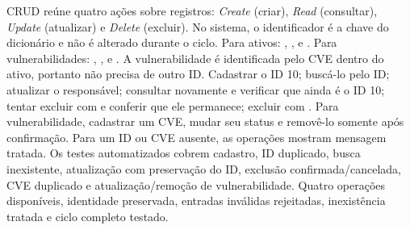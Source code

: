 
 CRUD reúne quatro ações sobre registros: \textit{Create} (criar), \textit{Read} (consultar), \textit{Update} (atualizar) e \textit{Delete} (excluir). No sistema, o identificador é a chave do dicionário e não é alterado durante o ciclo.
 Para ativos: , ,  e . Para vulnerabilidades: , ,  e . A vulnerabilidade é identificada pelo CVE dentro do ativo, portanto não precisa de outro ID.
 Cadastrar o ID 10; buscá-lo pelo ID; atualizar o responsável; consultar novamente e verificar que ainda é o ID 10; tentar excluir com  e conferir que ele permanece; excluir com . Para vulnerabilidade, cadastrar um CVE, mudar seu status e removê-lo somente após confirmação. Para um ID ou CVE ausente, as operações mostram mensagem tratada.
 Os testes automatizados cobrem cadastro, ID duplicado, busca inexistente, atualização com preservação do ID, exclusão confirmada/cancelada, CVE duplicado e atualização/remoção de vulnerabilidade.
 Quatro operações disponíveis, identidade preservada, entradas inválidas rejeitadas, inexistência tratada e ciclo completo testado.

